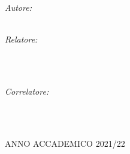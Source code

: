 \begin{titlepage}
\begin{center}
    \begin{minipage}[t]{0.59\textwidth}
    \begin{flushleft} \large
    \emph{Autore:}\\
    \spacedlowsmallcaps{\myName}\\
    \end{flushleft}
    \end{minipage}
    \begin{minipage}[t]{0.39\textwidth}
    \begin{flushright} \large
    \emph{Relatore:} \\
    \\
    \end{flushright}
    \end{minipage}\\[0.5cm]
    \begin{minipage}[t]{0.99\textwidth}
    \begin{flushright} \large
    \emph{Correlatore:} \\
    \\
    \end{flushright}
    \end{minipage}\\[3cm]

    \vfill

    ANNO ACCADEMICO 2021/22

  \end{center}
\end{titlepage}
